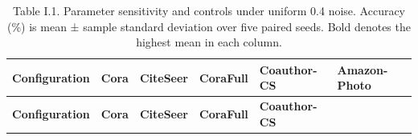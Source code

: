 \begin{longtable}[]{@{}
  >{\raggedright\arraybackslash}p{}
  >{\centering\arraybackslash}p{}
  >{\centering\arraybackslash}p{}
  >{\centering\arraybackslash}p{}
  >{\centering\arraybackslash}p{}
  >{\centering\arraybackslash}p{}@{}}
\caption{Table I.1. Parameter sensitivity and controls under uniform 0.4 noise. Accuracy (\%) is mean ± sample standard deviation over five paired seeds. Bold denotes the highest mean in each column.}\tabularnewline
\toprule\noalign{}
\begin{minipage}[b]{\linewidth}\raggedright
\textbf{Configuration}
\end{minipage} & \begin{minipage}[b]{\linewidth}\centering
\textbf{Cora}
\end{minipage} & \begin{minipage}[b]{\linewidth}\centering
\textbf{CiteSeer}
\end{minipage} & \begin{minipage}[b]{\linewidth}\centering
\textbf{CoraFull}
\end{minipage} & \begin{minipage}[b]{\linewidth}\centering
\textbf{Coauthor-CS}
\end{minipage} & \begin{minipage}[b]{\linewidth}\centering
\textbf{Amazon-Photo}
\end{minipage} \\
\midrule\noalign{}
\endfirsthead
\toprule\noalign{}
\begin{minipage}[b]{\linewidth}\raggedright
\textbf{Configuration}
\end{minipage} & \begin{minipage}[b]{\linewidth}\centering
\textbf{Cora}
\end{minipage} & \begin{minipage}[b]{\linewidth}\centering
\textbf{CiteSeer}
\end{minipage} & \begin{minipage}[b]{\linewidth}\centering
\textbf{CoraFull}
\end{minipage} & \begin{minipage}[b]{\linewidth}\centering
\textbf{Coauthor-CS}
\end{minipage} & \begin{minipage}[b]{\linewidth}\centering

\end{minipage}
\end{longtable}
